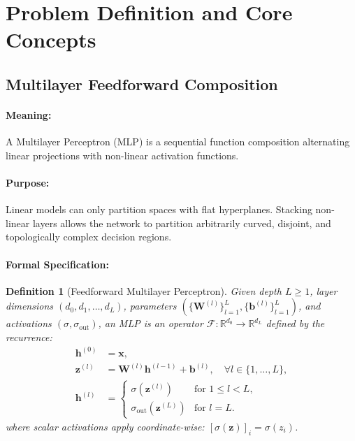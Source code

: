 \documentclass[11pt]{article}
\newtheorem{definition}{Definition}
\begin{document}
\section{Problem Definition and Core Concepts}
\label{sec:problem_definition}

\subsection{Multilayer Feedforward Composition}

\paragraph{Meaning:} A Multilayer Perceptron (MLP) is a sequential function composition alternating linear projections with non-linear activation functions.

\paragraph{Purpose:} Linear models can only partition spaces with flat hyperplanes. Stacking non-linear layers allows the network to partition arbitrarily curved, disjoint, and topologically complex decision regions.

\paragraph{Formal Specification:}
\begin{definition}[Feedforward Multilayer Perceptron]
Given depth $L \ge 1$, layer dimensions $(d_0, d_1, \dots, d_L)$, parameters $(\{\mathbf{W}^{(l)}\}_{l=1}^L, \{\mathbf{b}^{(l)}\}_{l=1}^L)$, and activations $(\sigma, \sigma_{\text{out}})$, an MLP is an operator $\mathcal{F}: \mathbb{R}^{d_0} \to \mathbb{R}^{d_L}$ defined by the recurrence:
\begin{align}
\mathbf{h}^{(0)} &= \mathbf{x}, \\
\mathbf{z}^{(l)} &= \mathbf{W}^{(l)} \mathbf{h}^{(l-1)} + \mathbf{b}^{(l)}, \quad \forall l \in \{1, \dots, L\}, \label{eq:mlp_affine} \\
\mathbf{h}^{(l)} &= \begin{cases}
\sigma(\mathbf{z}^{(l)}) & \text{for } 1 \le l < L, \\
\sigma_{\text{out}}(\mathbf{z}^{(L)}) & \text{for } l = L.
\end{cases} \label{eq:mlp_act}
\end{align}
where scalar activations apply coordinate-wise: $[\sigma(\mathbf{z})]_i = \sigma(z_i)$.
\end{definition}
\end{document}
